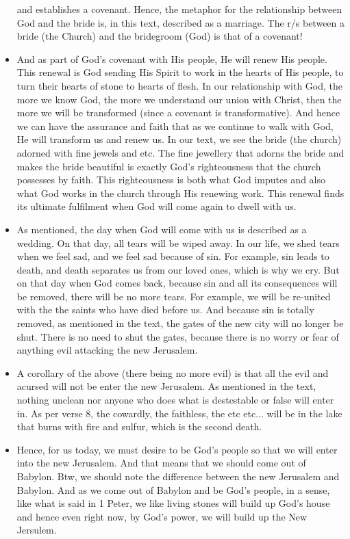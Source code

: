 \begin{itemize}
{  and establishes a covenant. Hence, the metaphor for the relationship
  between God and the bride is, in this text, described as a marriage. The
  r/s between a bride (the Church) and the bridegroom (God) is that of a
  covenant!}
  \item{And as part of God's covenant with His people, He will renew His
  people. This renewal is God sending His Spirit to work in the hearts of His
  people, to turn their hearts of stone to hearts of flesh. In our
  relationship with God, the more we know God, the more we understand our
  union with Christ, then the more we will be transformed (since a covenant
  is transformative). And hence we can have the assurance and faith that as
  we continue to walk with God, He will transform us and renew us. In our
  text, we see the bride (the church) adorned with fine jewels and etc. The
  fine jewellery that adorns the bride and makes the bride beautiful is
  exactly God's righteousness that the church possesses by faith. This
  righteousness is both what God imputes and also what God works in the
  church through His renewing work. This renewal finds its ultimate fulfilment when God will come again to dwell with us. }
  \item{As mentioned, the day when God will come with us is described as a
  wedding. On that day, all tears will be wiped away. In our life, we shed
  tears when we feel sad, and we feel sad because of sin. For example, sin
  leads to death, and death separates us from our loved ones, which is why we
  cry. But on that day when God comes back, because sin and all its
  consequences will be removed, there will be no more tears. For example, we
  will be re-united with the the saints who have died before us. And because
  sin is totally removed, as mentioned in the text, the gates of the new city
  will no longer be shut. There is no need to shut the gates, because there
  is no worry or fear of anything evil attacking the new Jerusalem. }
  \item{A corollary of the above (there being no more evil) is that all the
  evil and acursed will not be enter the new Jerusalem. As mentioned in the
  text, nothing unclean nor anyone who does what is destestable or false will
  enter in. As per verse $8$, the cowardly, the faithless, the etc etc...
  will be in the lake that burns with fire and sulfur, which is the second
  death.}
  \item{Hence, for us today, we must desire to be God's people so that we
  will enter into the new Jerusalem. And that means that we should come out
  of Babylon. Btw, we should note the difference between the new Jerusalem
  and Babylon. And as we come out of Babylon and be God's people, in a sense,
  like what is said in 1 Peter, we like living stones will build up God's
  house and hence even right now, by God's power, we will build up the New
  Jersulem. }



\end{itemize}
